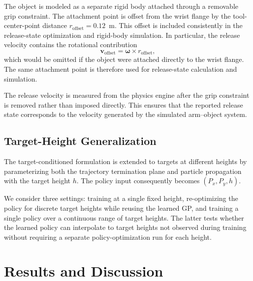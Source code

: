 \documentclass[letterpaper, 10 pt, conference]{ieeeconf}
\begin{document}
The object is modeled as a separate rigid body attached through a removable
grip constraint. The attachment point is offset from the wrist flange by the
tool-center-point distance $r_{\mathrm{offset}}=0.12$~m. This offset is
included consistently in the release-state optimization and rigid-body
simulation. In particular, the release velocity contains the rotational
contribution
\begin{equation}
\mathbf{v}_{\mathrm{offset}}
=
\boldsymbol{\omega}\times r_{\mathrm{offset}},
\end{equation}
which would be omitted if the object were attached directly to the wrist
flange. The same attachment point is therefore used for release-state
calculation and simulation.

The release velocity is measured from the physics engine after the grip
constraint is removed rather than imposed directly. This ensures that the
reported release state corresponds to the velocity generated by the simulated
arm--object system.

\subsection{Target-Height Generalization}
\label{sec:method-height}

The target-conditioned formulation is extended to targets at different
heights by parameterizing both the trajectory termination plane and particle
propagation with the target height $h$. The policy input consequently becomes
$(P_x,P_y,h)$.

We consider three settings: training at a single fixed height, re-optimizing
the policy for discrete target heights while reusing the learned GP, and
training a single policy over a continuous range of target heights. The latter
tests whether the learned policy can interpolate to target heights not observed
during training without requiring a separate policy-optimization run for each
height.

\section{Results and Discussion} \label{sec:results}
\end{document}
